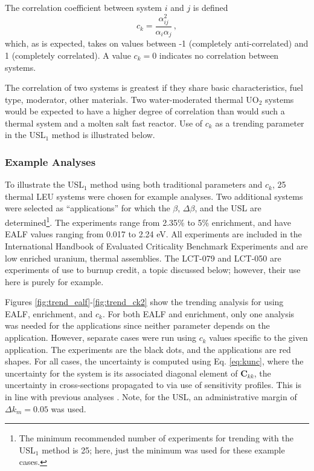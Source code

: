 The correlation coefficient between system $i$ and $j$ is defined
\begin{equation}
 c_{k} =  \frac{\alpha^2_{ij}}{\alpha_i \alpha_j}  \, ,
\label{eq:ck}
\end{equation}
which, as is expected, takes on values between -1 
(completely anti-correlated) and 1 (completely correlated). 
A value $c_k = 0$ indicates no correlation between systems.  

The correlation of two systems is greatest if they share basic 
characteristics, \eg fuel type, moderator, other materials.  Two 
water-moderated thermal UO$_2$ systems would be expected to have 
a higher degree of correlation than would such a thermal system 
and a molten salt fast reactor.  Use of $c_k$ as a trending 
parameter in the USL$_1$ method is illustrated below.


\subsubsection{Example Analyses}

To illustrate the USL$_1$ method using both traditional parameters 
and $c_k$, 25 thermal LEU systems were chosen for example analyses.  
Two additional systems were selected as ``applications'' for which 
the $\beta$, $\Delta \beta$, and the USL are determined\footnote{The 
minimum recommended number of experiments for trending with the 
USL$_1$ method is 25; here, just the minimum was used for these example 
cases.}. The experiments range from 2.35\% to 5\% enrichment, and have 
EALF values ranging from 0.017 to 2.24 eV.  %
All experiments 
are included in the International Handbook of Evaluated Criticality Benchmark 
Experiments \cite{ihecsbe} and are low enriched uranium, thermal assemblies.
The LCT-079 and LCT-050 are experiments
of use to burnup credit, a topic discussed below; however, their use here
is purely for example.  

Figures \ref{fig:trend_ealf}-\ref{fig:trend_ck2} show the trending analysis 
for using EALF, enrichment, and $c_k$.  For both EALF and enrichment, only 
one analysis was needed for the applications since neither parameter depends 
on the application.  However, separate cases were run using $c_k$ values 
specific to the given application.  The experiments are the black dots, 
and the applications are red shapes.  For all cases, the uncertainty is 
computed using Eq. \ref{eq:kunc}, where the uncertainty for the system is 
its associated diagonal element of $\mathbf{C}_{kk}$, \ie the uncertainty 
in cross-sections propagated to \keff via use of sensitivity profiles.  
This is in line with previous analyses \cite{broadhead2004sau}.  Note, for 
the USL, an administrative margin of $\Delta k_m = 0.05$ was used.

